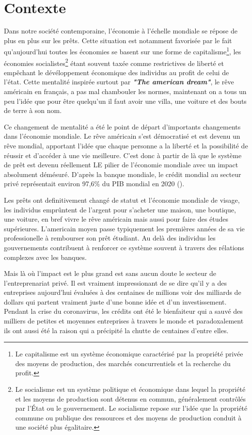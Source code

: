 \section{Contexte}
\label{chap1.section1}
Dans notre société contemporaine, l'économie à l'échelle mondiale se répose de plus en plus sur les prêts. Cette situation est notamment favorisée par le fait qu'aujourd'hui toutes les économies se basent sur une forme de capitalisme\footnote{Le capitalisme est un système économique caractérisé par la propriété privée des moyens de production, des marchés concurrentiels et la recherche du profit.}, les économies socialistes\footnote{Le socialisme est un système politique et économique dans lequel la propriété et les moyens de production sont détenus en commun, généralement contrôlés par l'État ou le gouvernement. Le socialisme repose sur l’idée que la propriété commune ou publique des ressources et des moyens de production conduit à une société plus égalitaire.} étant souvent taxée comme restrictives de liberté et empêchant le dévéloppement économique des individus au profit de celui de l'état. Cette mentalité inspirée surtout par \textbf{\textit{"The american dream"}}, le rêve américain en français, a pas mal chambouler les normes, maintenant on a tous un peu l'idée que pour être quelqu'un il faut avoir une villa, une voiture et des bouts de terre à son nom.

Ce changement de mentalité a été le point de départ d'importants changements dans l'économie mondiale. Le rêve américain s'est démocratisé et est devenu un rêve mondial, apportant l'idée que chaque personne a la liberté et la possibilité de réussir et d’accéder à une vie meilleure. C'est donc à partir de là que le système de prêt est devenu réellement LE pilier de l'économie mondiale avec un impact absolument démésuré. D'après la banque mondiale, le crédit mondial au secteur privé représentait environ 97,6\% du PIB mondial en 2020 (\cite{worldbank2024domestic}).

Les prêts ont definitivement changé de statut et l'économie mondiale de visage, les individus emprûntent de l'argent pour s'acheter une maison, une boutique, une voiture, en bref vivre le rêve américain mais aussi pour faire des études supérieures. L'americain moyen passe typiquement les premières années de sa vie professionelle à rembourser son prêt étudiant. Au delà des individus les gouvernements contribuent à renforcer ce système souvent à travers des rélations complexes avec les banques.

Mais là où l'impact est le plus grand est sans aucun doute le secteur de l'entreprenariat privé. Il est vraiment impressionant de se dire qu'il y a des entreprises aujourd'hui évaluées à des centaines de millions voir des milliards de dollars qui partent vraiment juste d'une bonne idée et d'un investissement. Pendant la crise du coronavirus, les crédits ont été le bienfaiteur qui a sauvé des milliers de petites et moyennes entreprises à travers le monde et paradoxalement ils ont aussi été la raison qui a précipité la chutte de centaines d'entre elles.

